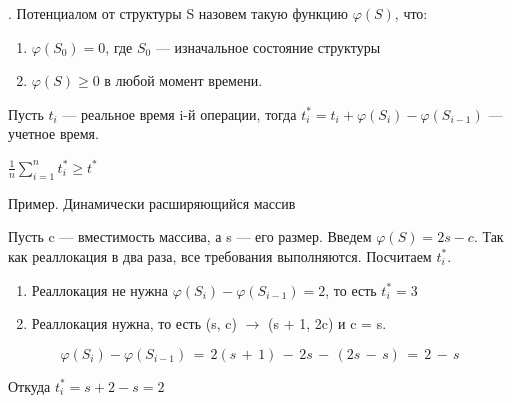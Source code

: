 \Def. Потенциалом от структуры S назовем такую функцию $\varphi(S)$, что:
\begin{enumerate}
    \item $\varphi(S_0) = 0$, где $S_0$ — изначальное состояние структуры
    \item $\varphi(S) \geq 0$ в любой момент времени.
\end{enumerate}

\Def Пусть $t_i$ — реальное время i-й операции, тогда
$t^*_i = t_i + \varphi(S_i) - \varphi(S_{i-1})$ — учетное время.

\Statement $\frac{1}{n} \sum\limits_{i=1}^n t_i^* \geq t^*$

\begin{center}
Пример. Динамически расширяющийся массив
\end{center}

Пусть c — вместимость массива, а s — его размер.
Введем $\varphi(S) = 2s - c$. Так как реаллокация в два раза, все требования
выполняются. Посчитаем $t_i^*$.

\begin{enumerate}
    \item Реаллокация не нужна $\varphi(S_i) - \varphi(S_{i-1}) = 2$, то есть $t_i^* = 3$
    \item Реаллокация нужна, то есть (s, c) $\rightarrow$ (s + 1, 2c) и c = s.
\end{enumerate}

$$\varphi(S_i) - \varphi(S_{i-1})\,=\,2(s\,+\,1)\,-\,2s\,-\,(2s\,-\,s)\,=\,2\,-\,s$$

Откуда $t_i^* = s + 2 - s = 2$

\pagebreak